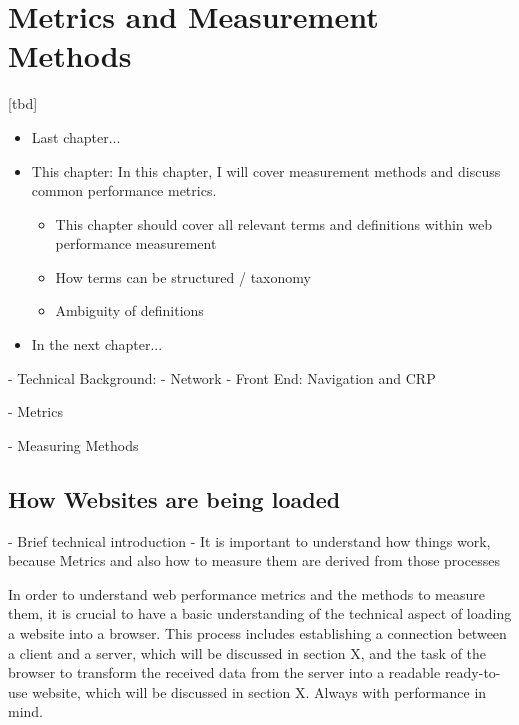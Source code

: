 \chapter{Metrics and Measurement Methods}

[tbd]

\begin{itemize}
	\item Last chapter...
	\item This chapter: In this chapter, I will cover measurement methods and discuss common performance metrics.
	\begin{itemize}
		\item This chapter should cover all relevant terms and definitions within web performance measurement
		\item How terms can be structured / taxonomy
		\item Ambiguity of definitions
	\end{itemize}
	\item In the next chapter...
\end{itemize}


- Technical Background:
	- Network
	- Front End: Navigation and CRP
	
- Metrics

- Measuring Methods







\section{How Websites are being loaded}

- Brief technical introduction
- It is important to understand how things work, because Metrics and also how to measure them are derived from those processes

In order to understand web performance metrics and the methods to measure them, it is crucial to have a basic understanding of the technical aspect of loading a website into a browser.
This process includes establishing a connection between a client and a server, which will be discussed in section X, and the task of the browser to transform the received data from the server into a readable ready-to-use website, which will be discussed in section X.
Always with performance in mind.

